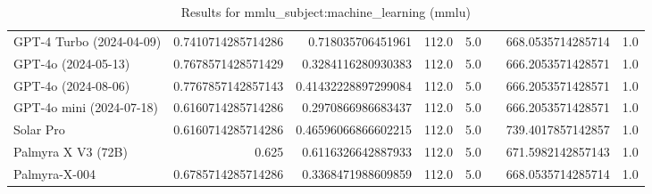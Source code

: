 \begin{table}[htp]
{\begin{tabular}{lrrrrrrr}
GPT-4 Turbo (2024-04-09) & 0.7410714285714286 & 0.718035706451961 & 112.0 & 5.0 &  & 668.0535714285714 & 1.0 \\
GPT-4o (2024-05-13) & 0.7678571428571429 & 0.3284116280930383 & 112.0 & 5.0 &  & 666.2053571428571 & 1.0 \\
GPT-4o (2024-08-06) & 0.7767857142857143 & 0.41432228897299084 & 112.0 & 5.0 &  & 666.2053571428571 & 1.0 \\
GPT-4o mini (2024-07-18) & 0.6160714285714286 & 0.2970866986683437 & 112.0 & 5.0 &  & 666.2053571428571 & 1.0 \\
Solar Pro & 0.6160714285714286 & 0.46596066866602215 & 112.0 & 5.0 &  & 739.4017857142857 & 1.0 \\
Palmyra X V3 (72B) & 0.625 & 0.6116326642887933 & 112.0 & 5.0 &  & 671.5982142857143 & 1.0 \\
Palmyra-X-004 & 0.6785714285714286 & 0.3368471988609859 & 112.0 & 5.0 &  & 668.0535714285714 & 1.0 \\
\bottomrule
\end{tabular}}
\caption{Results for mmlu_subject:machine_learning (mmlu)}
\label{fig:mmlu_subject:machine_learning (mmlu)}
\end{table}